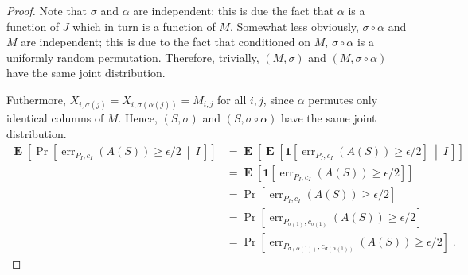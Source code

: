 \documentclass[12pt]{article}
\newcommand{\indicator}[1]{\mathbf{1}\left[{#1}\right]}
\DeclareMathOperator{\err}{err}
\DeclareMathOperator{\Exp}{\mathbf{E}}
\begin{document}
\begin{proof}
Note that $\sigma$ and $\alpha$ are independent; this is due the fact that
$\alpha$ is a function of $J$ which in turn is a function of $M$. Somewhat less
obviously, $\sigma \circ \alpha$ and $M$ are independent; this is due to the
fact that conditioned on $M$, $\sigma \circ \alpha$ is a uniformly random
permutation. Therefore, trivially, $(M,\sigma)$ and $(M, \sigma \circ \alpha)$
have the same joint distribution.

Futhermore, $X_{i,\sigma(j)} = X_{i,\sigma(\alpha(j))} = M_{i,j}$ for all
$i,j$, since $\alpha$ permutes only identical columns of $M$. Hence,
$(S,\sigma)$ and $(S,\sigma \circ \alpha)$ have the same joint distribution.
\begin{align*}
\Exp \left[ \Pr \left[\err_{P_I,c_I}(A(S)) \ge \epsilon/2 \ \middle| \ I \, \right] \right]
& = \Exp \left[ \Exp \left[ \indicator{ \err_{P_I,c_I}(A(S)) \ge \epsilon/2} \ \middle| \ I \, \right] \right] \\
& = \Exp \left[ \indicator{ \err_{P_I,c_I}(A(S)) \ge \epsilon/2} \right] \\
& = \Pr \left[ \err_{P_I,c_I}(A(S)) \ge \epsilon/2 \right] \\
& = \Pr \left[ \err_{P_{\sigma(1)},c_{\sigma(1)}}(A(S)) \ge \epsilon/2 \right] \\
& = \Pr \left[ \err_{P_{\sigma(\alpha(1))},c_{\sigma(\alpha(1))}}(A(S)) \ge \epsilon/2 \right] \; .
\end{align*}


\end{proof}
\end{document}
